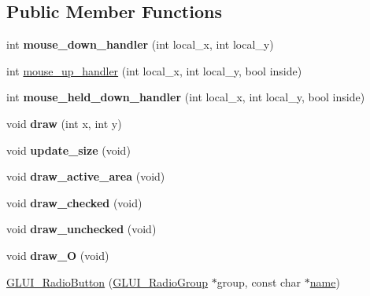 \subsection*{Public Member Functions}
\begin{DoxyCompactItemize}
\item 
\hypertarget{classGLUI__RadioButton_a1043d967fe810f9b71b80d17152b977a}{int {\bfseries mouse\-\_\-down\-\_\-handler} (int local\-\_\-x, int local\-\_\-y)}\label{classGLUI__RadioButton_a1043d967fe810f9b71b80d17152b977a}

\item 
int \hyperlink{classGLUI__RadioButton_a2d6e08dc0802146227e8cd4f4d5ef571}{mouse\-\_\-up\-\_\-handler} (int local\-\_\-x, int local\-\_\-y, bool inside)
\item 
\hypertarget{classGLUI__RadioButton_a7a5c7c04144139201848320c31f92844}{int {\bfseries mouse\-\_\-held\-\_\-down\-\_\-handler} (int local\-\_\-x, int local\-\_\-y, bool inside)}\label{classGLUI__RadioButton_a7a5c7c04144139201848320c31f92844}

\item 
\hypertarget{classGLUI__RadioButton_a21f6925f484831394a09e6f44dc8d11e}{void {\bfseries draw} (int x, int y)}\label{classGLUI__RadioButton_a21f6925f484831394a09e6f44dc8d11e}

\item 
\hypertarget{classGLUI__RadioButton_a18a5fd5c61bc61231df01972f85b464b}{void {\bfseries update\-\_\-size} (void)}\label{classGLUI__RadioButton_a18a5fd5c61bc61231df01972f85b464b}

\item 
\hypertarget{classGLUI__RadioButton_a0000fc6e9668323092c2acc0852851fb}{void {\bfseries draw\-\_\-active\-\_\-area} (void)}\label{classGLUI__RadioButton_a0000fc6e9668323092c2acc0852851fb}

\item 
\hypertarget{classGLUI__RadioButton_a7877448ee5aeb07b26e045d9d4a5c23b}{void {\bfseries draw\-\_\-checked} (void)}\label{classGLUI__RadioButton_a7877448ee5aeb07b26e045d9d4a5c23b}

\item 
\hypertarget{classGLUI__RadioButton_af0d77a13832451f0140c41e8bc0769a0}{void {\bfseries draw\-\_\-unchecked} (void)}\label{classGLUI__RadioButton_af0d77a13832451f0140c41e8bc0769a0}

\item 
\hypertarget{classGLUI__RadioButton_a1591bf4a0d8b0c1e286365d973693d40}{void {\bfseries draw\-\_\-\-O} (void)}\label{classGLUI__RadioButton_a1591bf4a0d8b0c1e286365d973693d40}

\item 
\hyperlink{classGLUI__RadioButton_ab3bda5fa0bd41bc49b064f474513ceaf}{G\-L\-U\-I\-\_\-\-Radio\-Button} (\hyperlink{classGLUI__RadioGroup}{G\-L\-U\-I\-\_\-\-Radio\-Group} $\ast$group, const char $\ast$\hyperlink{classGLUI__Control_aa95b97d50df45335fc33f0af03958eb3}{name})
\end{DoxyCompactItemize}
